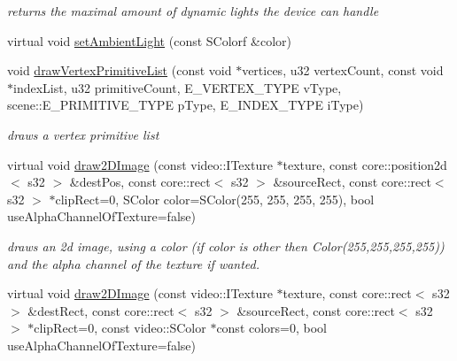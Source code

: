 \begin{DoxyCompactItemize}
\begin{DoxyCompactList}\small\item\em returns the maximal amount of dynamic lights the device can handle \end{DoxyCompactList}\item 
virtual void \hyperlink{classirr_1_1video_1_1_c_burning_video_driver_aadb68887c103f17ebb6967fe22b60e45}{set\-Ambient\-Light} (const S\-Colorf \&color)
\item 
\hypertarget{classirr_1_1video_1_1_c_burning_video_driver_af66cfd65aca0f9553731a4f91b0f68f8}{void \hyperlink{classirr_1_1video_1_1_c_burning_video_driver_af66cfd65aca0f9553731a4f91b0f68f8}{draw\-Vertex\-Primitive\-List} (const void $\ast$vertices, u32 vertex\-Count, const void $\ast$index\-List, u32 primitive\-Count, E\-\_\-\-V\-E\-R\-T\-E\-X\-\_\-\-T\-Y\-P\-E v\-Type, scene\-::\-E\-\_\-\-P\-R\-I\-M\-I\-T\-I\-V\-E\-\_\-\-T\-Y\-P\-E p\-Type, E\-\_\-\-I\-N\-D\-E\-X\-\_\-\-T\-Y\-P\-E i\-Type)}\label{classirr_1_1video_1_1_c_burning_video_driver_af66cfd65aca0f9553731a4f91b0f68f8}

\begin{DoxyCompactList}\small\item\em draws a vertex primitive list \end{DoxyCompactList}\item 
\hypertarget{classirr_1_1video_1_1_c_burning_video_driver_ae68816ab2cc9d7bd7b347ad758657c08}{virtual void \hyperlink{classirr_1_1video_1_1_c_burning_video_driver_ae68816ab2cc9d7bd7b347ad758657c08}{draw2\-D\-Image} (const video\-::\-I\-Texture $\ast$texture, const core\-::position2d$<$ s32 $>$ \&dest\-Pos, const core\-::rect$<$ s32 $>$ \&source\-Rect, const core\-::rect$<$ s32 $>$ $\ast$clip\-Rect=0, S\-Color color=S\-Color(255, 255, 255, 255), bool use\-Alpha\-Channel\-Of\-Texture=false)}\label{classirr_1_1video_1_1_c_burning_video_driver_ae68816ab2cc9d7bd7b347ad758657c08}

\begin{DoxyCompactList}\small\item\em draws an 2d image, using a color (if color is other then Color(255,255,255,255)) and the alpha channel of the texture if wanted. \end{DoxyCompactList}\item 
\hypertarget{classirr_1_1video_1_1_c_burning_video_driver_a63874f2e339a5c556b67a4fcd14e8c41}{virtual void \hyperlink{classirr_1_1video_1_1_c_burning_video_driver_a63874f2e339a5c556b67a4fcd14e8c41}{draw2\-D\-Image} (const video\-::\-I\-Texture $\ast$texture, const core\-::rect$<$ s32 $>$ \&dest\-Rect, const core\-::rect$<$ s32 $>$ \&source\-Rect, const core\-::rect$<$ s32 $>$ $\ast$clip\-Rect=0, const video\-::\-S\-Color $\ast$const colors=0, bool use\-Alpha\-Channel\-Of\-Texture=false)}\label{classirr_1_1video_1_1_c_burning_video_driver_a63874f2e339a5c556b67a4fcd14e8c41}


\end{DoxyCompactItemize}
